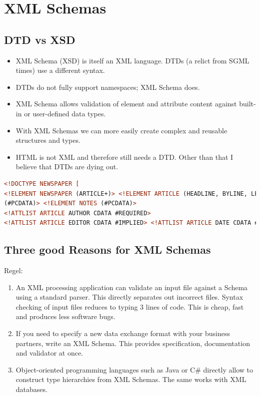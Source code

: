 \chapter{XML Schemas}

\section{DTD vs XSD}
\begin{itemize}
\item XML Schema (XSD) is itself an XML language. DTDs (a relict from SGML times) use a different syntax.
\item DTDs do not fully support namespaces; XML Schema does.
\item XML Schema allows validation of element and attribute content against built-in or user-defined data types.
\item With XML Schemas we can more easily create complex and reusable structures and types.
\item HTML is not XML and therefore still needs a DTD. Other than that I believe that DTDs are dying out.
\end{itemize}

\begin{lstlisting}[language=XML, caption={DTD Example}]
<!DOCTYPE NEWSPAPER [
<!ELEMENT NEWSPAPER (ARTICLE+)> <!ELEMENT ARTICLE (HEADLINE, BYLINE, LEAD, BODY, NOTES)> <!ELEMENT HEADLINE (#PCDATA)> <!ELEMENT BYLINE (#PCDATA)> <!ELEMENT LEAD (#PCDATA)> <!ELEMENT BODY
(#PCDATA)> <!ELEMENT NOTES (#PCDATA)>
<!ATTLIST ARTICLE AUTHOR CDATA #REQUIRED>
<!ATTLIST ARTICLE EDITOR CDATA #IMPLIED> <!ATTLIST ARTICLE DATE CDATA #IMPLIED> <!ATTLIST ARTICLE EDITION CDATA #IMPLIED> <!ENTITY NEWSPAPER "Vervet Logic Times"> <!ENTITY PUBLISHER "Vervet Logic Press"> <!ENTITY COPYRIGHT "Copyright 1998 Vervet Logic Press">]>
\end{lstlisting}

\section{Three good Reasons for XML Schemas}
Regel: 
\begin{enumerate}
\item An XML processing application can validate an input file against a Schema using a standard parser. This directly separates out incorrect files. Syntax checking of input files reduces to typing 3 lines of code. This is cheap, fast and produces less software bugs.
\item If you need to specify a new data exchange format with your business partners, write an XML Schema. This provides specification, documentation and validator at once.
\item Object-oriented programming languages such as Java or C\# directly allow to construct type hierarchies from XML Schemas. The same works with XML databases.
\end{enumerate}

